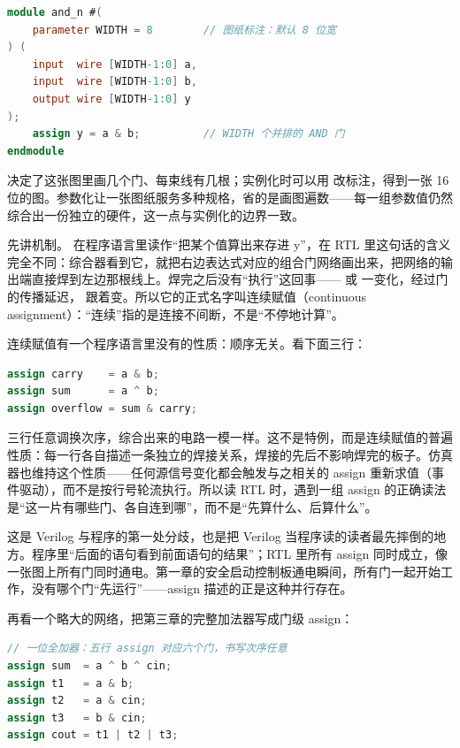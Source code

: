\begin{lstlisting}[language=Verilog]
module and_n #(
    parameter WIDTH = 8        // 图纸标注：默认 8 位宽
) (
    input  wire [WIDTH-1:0] a,
    input  wire [WIDTH-1:0] b,
    output wire [WIDTH-1:0] y
);
    assign y = a & b;          // WIDTH 个并排的 AND 门
endmodule
\end{lstlisting}

 决定了这张图里画几个门、每束线有几根；实例化时可以用  改标注，得到一张 16 位的图。参数化让一张图纸服务多种规格，省的是画图遍数——每一组参数值仍然综合出一份独立的硬件，这一点与实例化的边界一致。

先讲机制。 在程序语言里读作“把某个值算出来存进 y”，在 RTL 里这句话的含义完全不同：综合器看到它，就把右边表达式对应的组合门网络画出来，把网络的输出端直接焊到左边那根线上。焊完之后没有“执行”这回事—— 或  一变化，经过门的传播延迟， 跟着变。所以它的正式名字叫连续赋值（continuous assignment）：“连续”指的是连接不间断，不是“不停地计算”。

连续赋值有一个程序语言里没有的性质：顺序无关。看下面三行：

\begin{lstlisting}[language=Verilog]
assign carry    = a & b;
assign sum      = a ^ b;
assign overflow = sum & carry;
\end{lstlisting}

三行任意调换次序，综合出来的电路一模一样。这不是特例，而是连续赋值的普遍性质：每一行各自描述一条独立的焊接关系，焊接的先后不影响焊完的板子。仿真器也维持这个性质——任何源信号变化都会触发与之相关的 assign 重新求值（事件驱动），而不是按行号轮流执行。所以读 RTL 时，遇到一组 assign 的正确读法是“这一片有哪些门、各自连到哪”，而不是“先算什么、后算什么”。

这是 Verilog 与程序的第一处分歧，也是把 Verilog 当程序读的读者最先摔倒的地方。程序里“后面的语句看到前面语句的结果”；RTL 里所有 assign 同时成立，像一张图上所有门同时通电。第一章的安全启动控制板通电瞬间，所有门一起开始工作，没有哪个门“先运行”——assign 描述的正是这种并行存在。

再看一个略大的网络，把第三章的完整加法器写成门级 assign：

\begin{lstlisting}[language=Verilog]
// 一位全加器：五行 assign 对应六个门，书写次序任意
assign sum  = a ^ b ^ cin;
assign t1   = a & b;
assign t2   = a & cin;
assign t3   = b & cin;
assign cout = t1 | t2 | t3;
\end{lstlisting}

